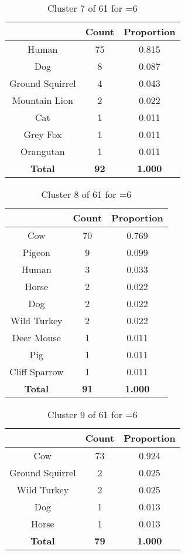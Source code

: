 \begin{table}[ht!]
\centering
\begin{tabular}{|c|c|c|}
\hline
\bf \Spec{} &\bf Count &\bf Proportion\\ \hline \hline
Human & 75 & 0.815\\ \hline
Dog & 8 & 0.087\\ \hline
Ground Squirrel & 4 & 0.043\\ \hline
Mountain Lion & 2 & 0.022\\ \hline
Cat & 1 & 0.011\\ \hline
Grey Fox & 1 & 0.011\\ \hline
Orangutan & 1 & 0.011\\ \hline
\hline
\bf Total & \bf 92 & \bf 1.000\\ \hline
\end{tabular}
\label{tab:cluster:7:6}
\caption{Cluster 7 of 61 for \minneigh{}=6}
\end{table}

\begin{table}[ht!]
\centering
\begin{tabular}{|c|c|c|}
\hline
\bf \Spec{} &\bf Count &\bf Proportion\\ \hline \hline
Cow & 70 & 0.769\\ \hline
Pigeon & 9 & 0.099\\ \hline
Human & 3 & 0.033\\ \hline
Horse & 2 & 0.022\\ \hline
Dog & 2 & 0.022\\ \hline
Wild Turkey & 2 & 0.022\\ \hline
Deer Mouse & 1 & 0.011\\ \hline
Pig & 1 & 0.011\\ \hline
Cliff Sparrow & 1 & 0.011\\ \hline
\hline
\bf Total & \bf 91 & \bf 1.000\\ \hline
\end{tabular}
\label{tab:cluster:8:6}
\caption{Cluster 8 of 61 for \minneigh{}=6}
\end{table}

\begin{table}[ht!]
\centering
\begin{tabular}{|c|c|c|}
\hline
\bf \Spec{} &\bf Count &\bf Proportion\\ \hline \hline
Cow & 73 & 0.924\\ \hline
Ground Squirrel & 2 & 0.025\\ \hline
Wild Turkey & 2 & 0.025\\ \hline
Dog & 1 & 0.013\\ \hline
Horse & 1 & 0.013\\ \hline
\hline
\bf Total & \bf 79 & \bf 1.000\\ \hline
\end{tabular}
\label{tab:cluster:9:6}
\caption{Cluster 9 of 61 for \minneigh{}=6}
\end{table}

